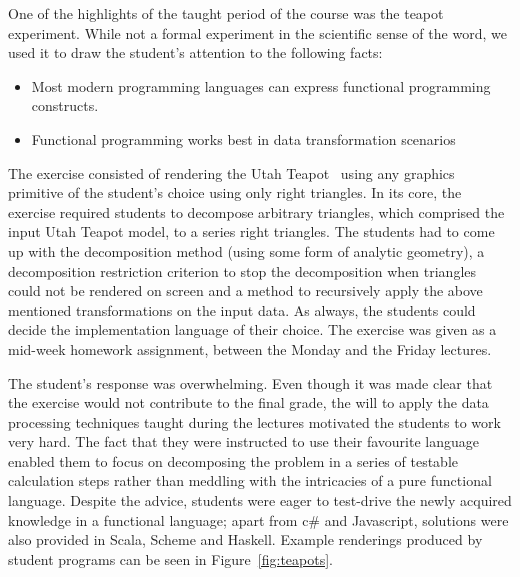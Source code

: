 \documentclass[conference]{IEEEtran}
\begin{document}
\begin{figure*}
\centering
\label{fig:teapots}
\caption[]{Example results from the teapot exercise.}
\end{figure*}

One of the highlights of the taught period of the course was the teapot
experiment. While not a formal experiment in the scientific sense of the word,
we used it to draw the student's attention to the following facts:

\begin{itemize}

  \item Most modern programming languages can express functional programming
    constructs.

  \item Functional programming works best in data transformation scenarios

\end{itemize}

The exercise consisted of rendering the Utah Teapot~\cite{Torre06} using any
graphics primitive of the student's choice using only right triangles.  In its
core, the exercise required students to decompose arbitrary triangles, which
comprised the input Utah Teapot model, to a series right triangles. The students
had to come up with the decomposition method (using some form of analytic
geometry), a decomposition restriction criterion to stop the decomposition when
triangles could not be rendered on screen and a method to recursively apply the
above mentioned transformations on the input data. As always, the students could
decide the implementation language of their choice. The exercise was given as a
mid-week homework assignment, between the Monday and the Friday lectures.

The student's response was overwhelming. Even though it was made clear that the
exercise would not contribute to the final grade, the will to apply the data
processing techniques taught during the lectures motivated the students to work
very hard. The fact that they were instructed to use their favourite language
enabled them to focus on decomposing the problem in a series of testable
calculation steps rather than meddling with the intricacies of a pure functional
language.  Despite the advice, students were eager to test-drive the newly
acquired knowledge in a functional language; apart from {\sc c\#} and
Javascript, solutions were also provided in Scala, Scheme and Haskell. Example
renderings produced by student programs can be seen in Figure~\ref{fig:teapots}.
\end{document}
